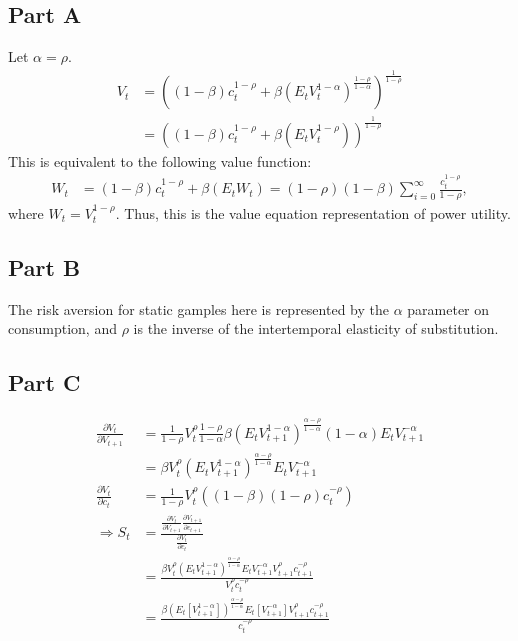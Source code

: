 \documentclass[11pt]{article} %
\begin{document}
\subsection{Part A}
Let $\alpha = \rho$.
\begin{align*}
V_t &= \left( (1-\beta) c_t^{1-\rho} + \beta(E_tV_t^{1-\alpha})^{\frac{1-\rho}{1-\alpha}} \right)^{\frac{1}{1-\rho}}\\
&= \left( (1-\beta) c_t^{1-\rho} + \beta(E_tV_t^{1-\rho}) \right)^{\frac{1}{1-\rho}}
\end{align*}
This is equivalent to the following value function:
\begin{align*}
W_t &= (1-\beta) c_t^{1-\rho} + \beta(E_tW_t) = (1-\rho)(1-\beta)\sum_{i=0}^{\infty}\frac{c_t^{1-\rho}}{1-\rho},
\end{align*}
where $W_t = V_t^{1-\rho}.$ Thus, this is the value equation representation of power utility.
\subsection{Part B}
The risk aversion for static gamples here is represented by the $\alpha$ parameter on consumption, and $\rho$ is the inverse of the intertemporal elasticity of substitution.
\subsection{Part C}
\begin{align*}
\frac{\partial V_t}{\partial V_{t+1}} &= \frac{1}{1-\rho}V_t^{\rho}\frac{1-\rho}{1-\alpha}\beta (E_tV_{t+1}^{1-\alpha})^{\frac{\alpha-\rho}{1-\alpha}}(1-\alpha)E_tV_{t+1}^{-\alpha} \\
&= \beta V_t^{\rho}  (E_tV_{t+1}^{1-\alpha})^{\frac{\alpha-\rho}{1-\alpha}} E_tV_{t+1}^{-\alpha}\\
\frac{\partial V_{t}}{\partial c_{t}} &=\frac{1}{1-\rho}V_t^{\rho}((1-\beta)(1-\rho)c_t^{-\rho}) \\
\Rightarrow S_t &= \frac{\frac{\partial V_t}{\partial V_{t+1}}\frac{\partial V_{t+1}}{\partial c_{t+1}} }{\frac{\partial V_{t}}{\partial c_{t}} }\\
&= \frac{ \beta V_t^{\rho}  (E_tV_{t+1}^{1-\alpha})^{\frac{\alpha-\rho}{1-\alpha}} E_tV_{t+1}^{-\alpha}V_{t+1}^{\rho}c_{t+1}^{-\rho} }{V_t^{\rho}c_t^{-\rho} }\\
&= \frac{ \beta  (E_t[V_{t+1}^{1-\alpha}])^{\frac{\alpha-\rho}{1-\alpha}} E_t[V_{t+1}^{-\alpha}]V_{t+1}^{\rho}c_{t+1}^{-\rho} }{c_t^{-\rho} } 
\end{align*}
\end{document}
